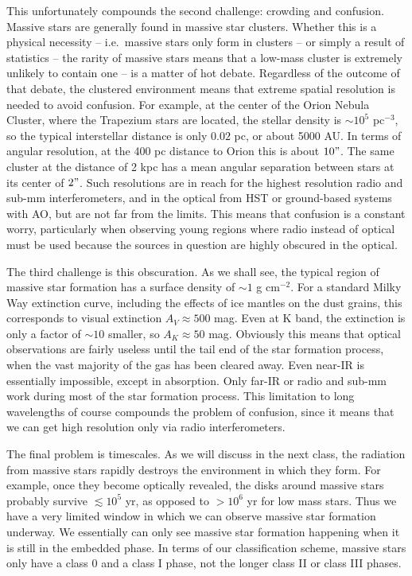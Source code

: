 This unfortunately compounds the second challenge: crowding and confusion. Massive stars are generally found in massive star clusters. Whether this is a physical necessity -- i.e.\ massive stars only form in clusters -- or simply a result of statistics -- the rarity of massive stars means that a low-mass cluster is extremely unlikely to contain one -- is a matter of hot debate. Regardless of the outcome of that debate, the clustered environment means that extreme spatial resolution is needed to avoid confusion. For example, at the center of the Orion Nebula Cluster, where the Trapezium stars are located, the stellar density is $\sim 10^5$ pc$^{-3}$, so the typical interstellar distance is only $0.02$ pc, or about 5000 AU. In terms of angular resolution, at the 400 pc distance to Orion this is about $10"$. The same cluster at the distance of 2 kpc has a mean angular separation between stars at its center of $2"$. Such resolutions are in reach for the highest resolution radio and sub-mm interferometers, and in the optical from HST or ground-based systems with AO, but are not far from the limits. This means that confusion is a constant worry, particularly when observing young regions where radio instead of optical must be used because the sources in question are highly obscured in the optical.

The third challenge is this obscuration. As we shall see, the typical region of massive star formation has a surface density of $\sim 1$ g cm$^{-2}$. For a standard Milky Way extinction curve, including the effects of ice mantles on the dust grains, this corresponds to visual extinction $A_V\approx 500$ mag. Even at K band, the extinction is only a factor of $\sim 10$ smaller, so $A_K\approx 50$ mag. Obviously this means that optical observations are fairly useless until the tail end of the star formation process, when the vast majority of the gas has been cleared away. Even near-IR is essentially impossible, except in absorption. Only far-IR or radio and sub-mm work during most of the star formation process. This limitation to long wavelengths of course compounds the problem of confusion, since it means that we can get high resolution only via radio interferometers.

The final problem is timescales. As we will discuss in the next class, the radiation from massive stars rapidly destroys the environment in which they form. For example, once they become optically revealed, the disks around massive stars probably survive $\lesssim 10^5$ yr, as opposed to $>10^6$ yr for low mass stars. Thus we have a very limited window in which we can observe massive star formation underway. We essentially can only see massive star formation happening when it is still in the embedded phase. In terms of our classification scheme, massive stars only have a class 0 and a class I phase, not the longer class II or class III phases.

